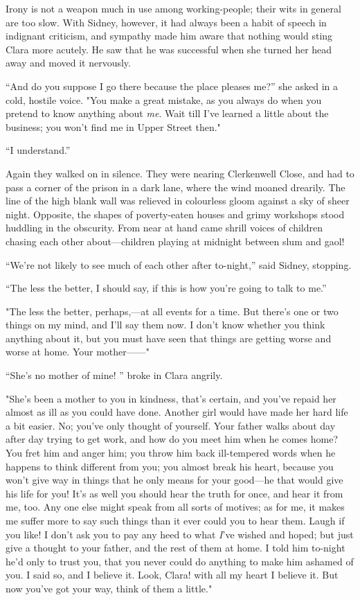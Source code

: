 Irony is not a weapon much in use among working-people; their wits in
general are too slow. With Sidney, however, it had always been a habit
of speech in indignant criticism, and sympathy made him aware that
nothing would sting Clara more acutely. He saw that he was successful
when she turned her head away and moved it nervously.

``And do you suppose I go there because the place pleases me?'' she
asked in a cold, hostile voice. "You make a great mistake, as you always
do when you pretend to know anything about \emph{me}. Wait till I've
learned a little about the business; you won't find me in Upper Street
then."

``I understand.''

Again they walked on in silence. They were nearing Clerkenwell Close,
and had to pass a corner of the prison in a dark lane, where the wind
moaned drearily. The line of the high blank wall was relieved in
colourless gloom against a sky of sheer night.
{\protect\hypertarget{77}{}{}}Opposite, the shapes of poverty-eaten
houses and grimy workshops stood huddling in the obscurity. From near at
hand came shrill voices of children chasing each other about---children
playing at midnight between slum and gaol!

``We're not likely to see much of each other after to-night,'' said
Sidney, stopping.

``The less the better, I should say, if this is how you're going to talk
to me.''

"The less the better, perhaps,---at all events for a time. But there's
one or two things on my mind, and I'll say them now. I don't know
whether you think anything about it, but you must have seen that things
are getting worse and worse at home. Your mother{{------}}"

``She's no mother of mine! '' broke in Clara angrily.

"She's been a mother to you in kindness, that's certain, and you've
repaid her almost as ill as you could have done. Another girl would have
made her hard life a bit easier. No; you've only thought of yourself.
Your {\protect\hypertarget{78}{}{}}father walks about day after day
trying to get work, and how do you meet him when he comes home? You fret
him and anger him; you throw him back ill-tempered words when he happens
to think different from you; you almost break his heart, because you
won't give way in things that he only means for your good---he that
would give his life for you! It's as well you should hear the truth for
once, and hear it from me, too. Any one else might speak from all sorts
of motives; as for me, it makes me suffer more to say such things than
it ever could you to hear them. Laugh if you like! I don't ask you to
pay any heed to what \emph{I}'ve wished and hoped; but just give a
thought to your father, and the rest of them at home. I told him
to-night he'd only to trust you, that you never could do anything to
make him ashamed of you. I said so, and I believe it. Look, Clara! with
all my heart I believe it. But now you've got your way, think of them a
little."

